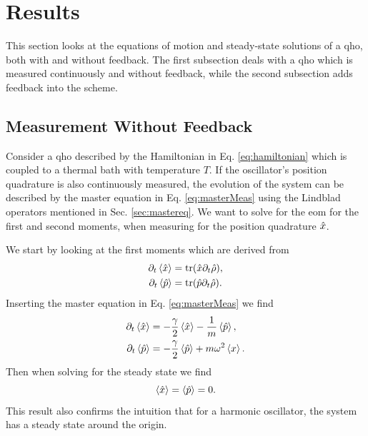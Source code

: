 \section{Results}
This section looks at the equations of motion and steady-state solutions of a \gls{qho}, both with and without feedback. The first subsection deals with a \gls{qho} which is measured continuously and without feedback, while the second subsection adds feedback into the scheme.
\subsection{Measurement Without Feedback}
Consider a \gls{qho} described by the Hamiltonian in Eq. \eqref{eq:hamiltonian} which is coupled to a thermal bath with temperature $T$. If the oscillator's position quadrature is also continuously measured, the evolution of the system can be described by the master equation in Eq. \eqref{eq:masterMeas} using the Lindblad operators mentioned in Sec. \ref{sec:mastereq}. We want to solve for the \gls{eom} for the first and second moments, when measuring for the position quadrature $\hat{x}$. 

We start by looking at the first moments which are derived from
\begin{align}
    \partial_t\expval{\hat{x}} &= \tr(\hat{x} \partial_t \hat{\rho}),\\
    \partial_t\expval{\hat{p}} &= \tr(\hat{p} \partial_t \hat{\rho}).
\end{align}
Inserting the master equation in Eq. \eqref{eq:masterMeas} we find 
\begin{align}
    \partial_t\expval{\hat{x}} &= -\frac{\gamma}{2} \expval{\hat{x}} - \frac{1}{m} \expval{\hat{p}},\\
    \partial_t\expval{\hat{p}} &= -\frac{\gamma}{2} \expval{\hat{p}} + m\omega^2 \expval{x}.
\end{align}
Then when solving for the steady state we find 
\begin{equation}
    \expval{\hat{x}} = \expval{\hat{p}} = 0. \label{eq:xp0}
\end{equation}
This result also confirms the intuition that for a harmonic oscillator, the system has a steady state around the origin. 

